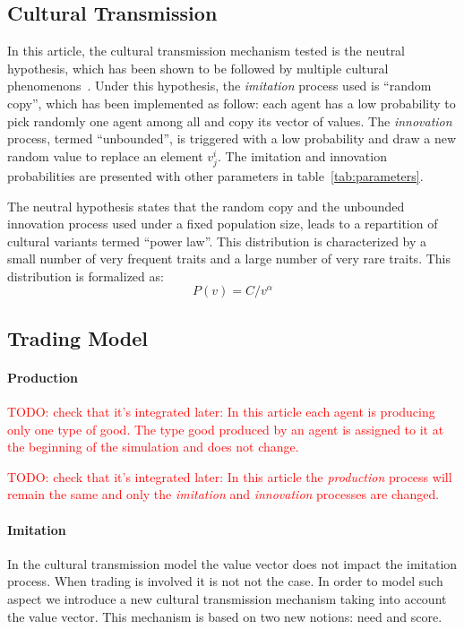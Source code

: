 \documentclass{wscpaperproc}
\newcommand{\memo}[2]{\textcolor{#1}{#2}}
\newcommand{\todo}[1]{\memo{red}{TODO: #1\\}}
\begin{document}
\subsection{Cultural Transmission}

In this article, the cultural transmission mechanism tested is the neutral hypothesis, which has been shown to be followed by multiple cultural phenomenons~\cite{bentley_random_2004,bentley_specialisation_2005,mesoudi_random_2009}. 
Under this hypothesis, the \emph{imitation} process used is  ``random copy'', which has been implemented as follow: each agent has a low probability to pick randomly one agent among all and copy its vector of values. The \emph{innovation} process, termed ``unbounded'', is triggered with a low probability and draw a new random value to replace an element $v^i_j$. The imitation and innovation probabilities are presented with other parameters in table~\ref{tab:parameters}.

The neutral hypothesis states that the random copy and the unbounded innovation process used under a fixed population size, leads to a repartition of cultural variants termed ``power law''. This distribution is characterized by a small number of very frequent traits and a large number of very rare traits. This distribution is formalized as: $$P(v)=C/v^\alpha $$

\subsection{Trading Model}\label{sec:trade}
\paragraph{Production}
\todo{check that it's integrated later: In this article each agent is producing only one type of good. The type good produced by an agent is assigned to it at the beginning of the simulation and does not change.}

\todo{check that it's integrated later: 
In this article the \textit{production} process will remain the same and only the \textit{imitation} and \textit{innovation} processes are changed.}

\paragraph{Imitation}
In the cultural transmission model the value vector does not impact the imitation process. When trading is involved it is not not the case. In order to model such aspect we introduce a new cultural transmission mechanism taking into account the value vector. This mechanism is based on two new notions: need and score. 
\end{document}
